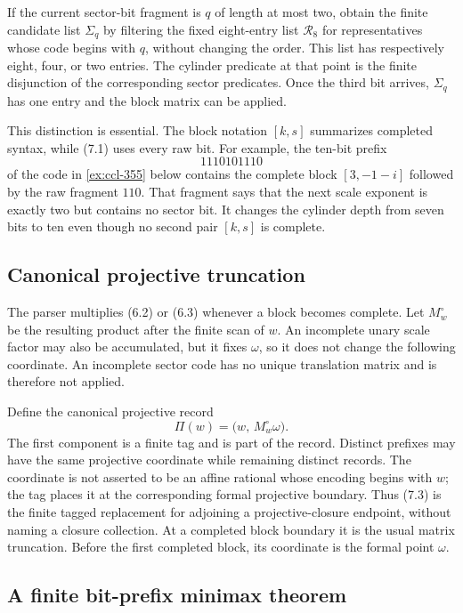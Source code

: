 \documentclass[10pt]{article}
\theoremstyle{definition}
\theoremstyle{remark}
\begin{document}
If the current sector-bit fragment is $q$ of length at most two, obtain the finite candidate list $\Sigma_q$ by filtering the fixed eight-entry list $\mathcal R_8$ for representatives whose code begins with $q$, without changing the order.  This list has respectively eight, four, or two entries.  The cylinder predicate at that point is the finite disjunction of the corresponding sector predicates.  Once the third bit arrives, $\Sigma_q$ has one entry and the block matrix can be applied.

This distinction is essential.  The block notation $[k,s]$ summarizes completed syntax, while (7.1) uses every raw bit.  For example, the ten-bit prefix
\[
 1110101110
\]
of the code in \autoref{ex:ccl-355} below contains the complete block $[3,-1-i]$ followed by the raw fragment $110$.  That fragment says that the next scale exponent is exactly two but contains no sector bit.  It changes the cylinder depth from seven bits to ten even though no second pair $[k,s]$ is complete.

\subsection{Canonical projective truncation}

The parser multiplies (6.2) or (6.3) whenever a block becomes complete.  Let $M_w^\circ$ be the resulting product after the finite scan of $w$.  An incomplete unary scale factor may also be accumulated, but it fixes $\omega$, so it does not change the following coordinate.  An incomplete sector code has no unique translation matrix and is therefore not applied.

Define the canonical projective record
\[
 \Pi(w)=\bigl(w,\,M_w^\circ\omega\bigr).
\tag{7.3}
\]
The first component is a finite tag and is part of the record.  Distinct prefixes may have the same projective coordinate while remaining distinct records.  The coordinate is not asserted to be an affine rational whose encoding begins with $w$; the tag places it at the corresponding formal projective boundary.  Thus (7.3) is the finite tagged replacement for adjoining a projective-closure endpoint, without naming a closure collection.  At a completed block boundary it is the usual matrix truncation.  Before the first completed block, its coordinate is the formal point $\omega$.

\subsection{A finite bit-prefix minimax theorem}
\end{document}
